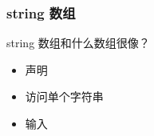 \begin{frame}[fragile]
    \frametitle{string 数组}

     {
        \begin{block}{}
            \vspace{.5cm}
            \begin{center}
                string 数组和什么数组很像？
            \end{center}
            \vspace{.5cm}
        \end{block}
    }

     {
        \begin{itemize}
            \item 声明
            
            
    
            \item 访问单个字符串
            
            
    
            \item 输入
            
            
    
        \end{itemize}
    }

\end{frame}
